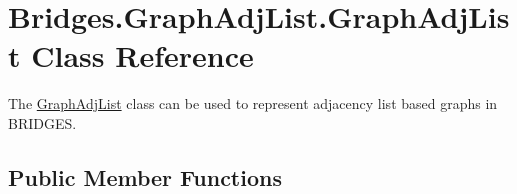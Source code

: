 \hypertarget{class_bridges_1_1_graph_adj_list_1_1_graph_adj_list}{}\section{Bridges.\+Graph\+Adj\+List.\+Graph\+Adj\+List Class Reference}
\label{class_bridges_1_1_graph_adj_list_1_1_graph_adj_list}


The \hyperlink{class_bridges_1_1_graph_adj_list_1_1_graph_adj_list}{Graph\+Adj\+List} class can be used to represent adjacency list based graphs in B\+R\+I\+D\+G\+E\+S.  


\subsection*{Public Member Functions}
